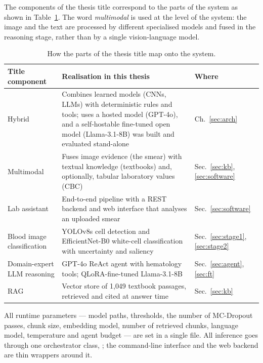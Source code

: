 The components of the thesis title correspond to the parts of the system as shown in Table~\ref{tab:title}. The word \emph{multimodal} is used at the level of the system: the image and the text are processed by different specialised models and fused in the reasoning stage, rather than by a single vision-language model.

\begin{table}[H]
\centering
\caption{How the parts of the thesis title map onto the system.}
\label{tab:title}
\small
\begin{tabularx}{\textwidth}{>{\raggedright\arraybackslash}p{4.2cm} X >{\raggedright\arraybackslash}p{2.2cm}}
\toprule
\textbf{Title component} & \textbf{Realisation in this thesis} & \textbf{Where} \\
\midrule
Hybrid & Combines learned models (CNNs, LLMs) with deterministic rules and tools; uses a hosted model (GPT-4o), and a self-hostable fine-tuned open model (Llama-3.1-8B) was built and evaluated stand-alone & Ch.~\ref{sec:arch} \\
Multimodal & Fuses image evidence (the smear) with textual knowledge (textbooks) and, optionally, tabular laboratory values (CBC) & Sec.~\ref{sec:kb}, \ref{sec:software} \\
Lab assistant & End-to-end pipeline with a REST backend and web interface that analyses an uploaded smear & Sec.~\ref{sec:software} \\
Blood image classification & YOLOv8s cell detection and EfficientNet-B0 white-cell classification with uncertainty and saliency & Sec.~\ref{sec:stage1}, \ref{sec:stage2} \\
Domain-expert LLM reasoning & GPT-4o ReAct agent with hematology tools; QLoRA-fine-tuned Llama-3.1-8B & Sec.~\ref{sec:agent}, \ref{sec:ft} \\
RAG & Vector store of 1{,}049 textbook passages, retrieved and cited at answer time & Sec.~\ref{sec:kb} \\
\bottomrule
\end{tabularx}
\end{table}

All runtime parameters --- model paths, thresholds, the number of MC-Dropout passes, chunk size, embedding model, number of retrieved chunks, language model, temperature and agent budget --- are set in a single  file. All inference goes through one orchestrator class, ; the command-line interface and the web backend are thin wrappers around it.

